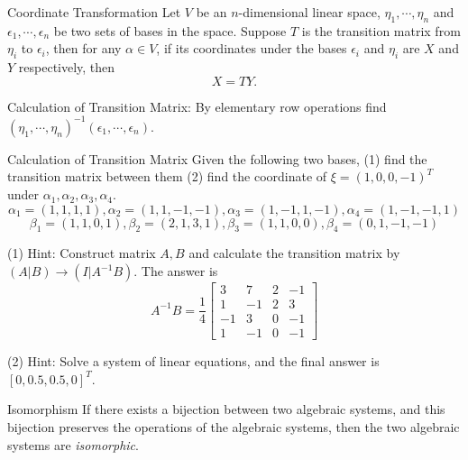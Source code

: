 \begin{proposition}{Coordinate Transformation}{}
  Let $V$ be an $n$-dimensional linear space, $\eta_1,\cdots,\eta_n$ and
  $\epsilon_1,\cdots, \epsilon_n$ be two sets of bases in the space.
  Suppose $T$ is the transition matrix from $\eta_i$ to $\epsilon_i$,
  then for any $\alpha \in V$, if its coordinates under the bases $\epsilon_i$
  and $\eta_i$ are $X$ and $Y$ respectively, then
  \begin{equation}
    X = TY.
  \end{equation}
\end{proposition}

\begin{note}{}
  Calculation of Transition Matrix:
  By elementary row operations find $(\eta_1, \cdots, \eta_n)^{-1} (\epsilon_1,
  \cdots, \epsilon_n)$.
\end{note}

\begin{example}{Calculation of Transition Matrix}{}
  Given the following two bases, (1) find the transition matrix between them
  (2) find the coordinate of $\xi = (1, 0, 0, -1)^T$ under $\alpha_1, \alpha_2,
  \alpha_3, \alpha_4$.
  \begin{equation}
    \alpha_1=(1,1,1,1),\alpha_2=(1,1,-1,-1),\alpha_3=(1,-1,1,-1),\alpha_4=(1,-1,-1,1)
  \end{equation}
  \begin{equation}
    \beta_1=(1,1,0,1),\beta_2=(2,1,3,1),\beta_3=(1,1,0,0),\beta_4=(0,1,-1,-1)
  \end{equation}
\end{example}

\begin{solution}
  (1) Hint: Construct matrix $A, B$ and calculate the transition matrix by
  $(A|B) \rightarrow (I|A^{-1}B)$. The answer is
  \begin{equation}
    A^{-1}B=\frac{1}{4}\left[\begin{array}{cccc}3&7&2&-1\\1&-1&2&3\\-1&3&0&-1\\1&-1&0&-1\end{array}\right]
  \end{equation}

  (2) Hint: Solve a system of linear equations, and the final answer is $[0,
  0.5, 0.5, 0]^T$.
\end{solution}

\begin{definition}{Isomorphism}{}
  If there exists a bijection between two algebraic systems,
  and this bijection preserves the operations of the algebraic systems,
  then the two algebraic systems are \emph{isomorphic}.
\end{definition}

